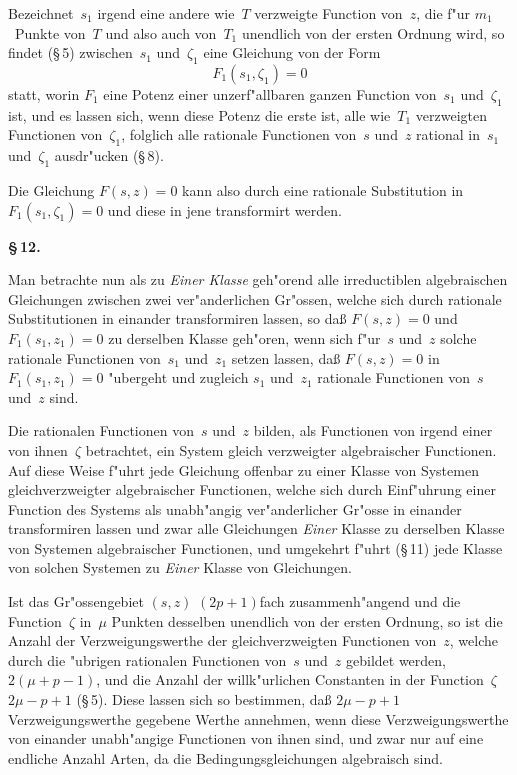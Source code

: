 \documentclass[12pt,a4paper]{article}
\begin{document}
Bezeichnet~$s_1$ irgend eine andere wie~$T$ verzweigte Function von~$z$,
die f"ur $m_1$~Punkte von~$T$ und also auch von~$T_1$ unendlich von der
ersten Ordnung wird, so findet (\S\,5) zwischen~$s_1$ und~$\zeta_1$ eine
Gleichung von der Form
\[
F_1(s_1, \zeta_1) = 0
\]
statt, worin $F_1$ eine Potenz einer unzerf"allbaren ganzen Function von~$s_1$
und~$\zeta_1$ ist, und es lassen sich, wenn diese Potenz die erste ist, alle
wie~$T_1$ verzweigten Functionen von~$\zeta_1$, folglich alle rationale Functionen
von~$s$ und~$z$ rational in~$s_1$ und~$\zeta_1$ ausdr"ucken (\S\,8).

Die Gleichung $F(s,z) = 0$ kann also durch eine rationale Substitution
in $F_1(s_1, \zeta_1) = 0$ und diese in jene transformirt werden.

\medskip
\textbf{\S\,12.}

Man betrachte nun als zu \emph{Einer Klasse} geh"orend alle irreductiblen
algebraischen Gleichungen zwischen zwei ver"anderlichen Gr"ossen, welche
sich durch rationale Substitutionen in einander transformiren lassen, so
da\ss{} $F(s,z) = 0$ und $F_1(s_1, z_1) = 0$ zu derselben Klasse geh"oren,
wenn sich f"ur~$s$ und~$z$ solche rationale Functionen von~$s_1$ und~$z_1$
setzen lassen, da\ss{} $F(s,z) = 0$ in $F_1(s_1, z_1) = 0$ "ubergeht und
zugleich $s_1$ und~$z_1$ rationale Functionen von~$s$ und~$z$ sind.

Die rationalen Functionen von~$s$ und~$z$ bilden, als Functionen von
irgend einer von ihnen~$\zeta$ betrachtet, ein System gleich verzweigter
algebraischer Functionen. Auf diese Weise f"uhrt jede Gleichung offenbar
zu einer Klasse von Systemen gleichverzweigter algebraischer Functionen,
welche sich durch Einf"uhrung einer Function des Systems als unabh"angig
ver"anderlicher Gr"osse in einander transformiren lassen und zwar alle
Gleichungen \emph{Einer} Klasse zu derselben Klasse von Systemen algebraischer
Functionen, und umgekehrt f"uhrt (\S\,11) jede Klasse von solchen Systemen
zu \emph{Einer} Klasse von Gleichungen.

Ist das Gr"ossengebiet $(s,z)$ $(2p+1)$fach zusammenh"angend und die
Function~$\zeta$ in~$\mu$ Punkten desselben unendlich von der ersten Ordnung,
so ist die Anzahl der Verzweigungswerthe der gleichverzweigten Functionen
von~$z$, welche durch die "ubrigen rationalen Functionen von~$s$ und~$z$
gebildet werden, $2(\mu + p - 1)$, und die Anzahl der willk"urlichen Constanten
in der Function~$\zeta$ $2\mu - p + 1$ (\S\,5). Diese lassen sich so bestimmen,
da\ss{} $2\mu - p + 1$ Verzweigungswerthe gegebene Werthe annehmen, wenn
diese Verzweigungswerthe von einander unabh"angige Functionen von ihnen
sind, und zwar nur auf eine endliche Anzahl Arten, da die Bedingungsgleichungen
algebraisch sind.
\end{document}
